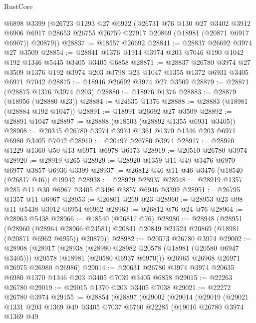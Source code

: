 \begin{lexlean}{RustCore}
\begin{coremodule}
    @6898
    @3399
    (@26723
      @1293
      @27
      @6922
      (@26731
        @76
        @130
        @27
        @3402
        @3912
        @6906
        @6917
        @28653
        @26755
        @26759
        @27917
        @20869
        (@18981 (@20871 @6917 @6907))
        @20879))
@28837 := @18557 @26692
@28841 := @28837 @26692 @3974 @27 @3509
@28854 := @28841 @1376 @1914 @3974 @203 @7046 @190 @1042 @192 @1346 @5445 @3405 @3405 @6858
@28871 := @28837
    @26780
    @3974
    @27
    @3509
    @1376
    @192
    @3974
    @203
    @3798
    @23
    @1047
    @1355
    @1372
    @6931
    @3405
    @6971
    @7042
@28875 := @18946 @26692 @3974 @27 @3509
@28879 := @28871 (@28875 @1376 @3974 @203)
@28880 := @18976 @1376
@28883 := @28879 (@18956 (@28880 @23))
@28884 := @24635 @1376
@28888 := @28883 (@18981 (@28884 @192 @1047))
@28891 := @18991 @26692 @27 @3509
@28892 := @28891 @1047
@28897 := @28888 (@18503 (@28892 @1355 @6931 @3405))
@28908 := @20345 @26780 @3974 @3974 @1361 @1370 @1346 @203 @6971 @6980 @3405 @7042
@28910 := @20497 @26780 @3974
@28917 := @28910 @1229 @1360 @50 @13 @6971 @6978 @6173
@28919 := @20510 @26780 @3974
@28920 := @28919 @265
@28929 := @28920 @1359 @11 @49 @3476 @6970 @6977 @3857 @6936 @3399
@28937 := @26812 @46 @11 @46 @3476 (@18540 (@26817 @46)) @19942
@28938 := @28929 @28937
@28948 := @28919 @1357 @285 @11 @30 @6967 @3405 @3496 @3857 @6946 @3399
@28951 := @26795 @1357 @11 @6967
@28953 := @26801 @269 @23
@28960 := @28953 @23 @98 @11 @5438 @3912 @6954 @6962
@28963 := @26812 @76 @24 @76
@28964 := @28963 @5438
@28966 := @18540 (@26817 @76)
@28980 := @28948
    (@28951
      (@28960
        (@28964 @28966 @24581)
        @20841
        @20849
        @21524
        @20869
        (@18981 (@20871 @6962 @6955))
        @20879))
@28982 := @20573 @26780 @3974
@29002 := @28908
    (@28917
      (@28938
        (@28980 @28982 @20578 (@18981 (@20580 @6947 @3405)))
        @20578
        (@18981 (@20580 @6937 @6970)))
      @26965
      @26968
      @26971
      @26975
      @26980
      @26986)
@29014 := @20631 @26780 @3974 @3974 @20635 @6980 @1370 @1346 @203 @3405 @7039 @3405 @6858
@29015 := @22263 @26780
@29019 := @29015 @1370 @203 @3405 @7038
@29021 := @22272 @26780 @3974
@29155 := @28854
    (@28897
      (@29002
        (@29014
          (@29019
            (@29021
              @1331
              @203
              @1369
              @49
              @3405
              @7037
              @6760
              @22285
              (@19016
                @26780
                @3974
                @1369
                @49

\end{coremodule}
\end{lexlean}

